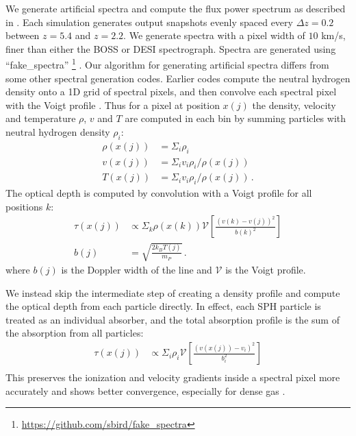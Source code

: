 \documentclass[a4paper,11pt]{article}
\newcommand{\Lya}{Lyman-$\alpha$}
\begin{document}
We generate artificial spectra and compute the flux power spectrum as described in \cite{Bird:2019}. Each simulation generates output snapshots evenly spaced every $\Delta z = 0.2$ between $z = 5.4$ and $z = 2.2$. We generate spectra with a pixel width of $10$ km/s, finer than either the BOSS or DESI spectrograph. Spectra are generated using ``fake\_spectra'' \footnote{\url{https://github.com/sbird/fake_spectra}} \cite{FSFE:2017}. Our algorithm for generating artificial spectra differs from some other spectral generation codes. Earlier codes compute the neutral hydrogen density onto a 1D grid of spectral pixels, and then convolve each spectral pixel with the Voigt profile \cite[e.g.~]{Theuns:1998, Chabanier:2022}. Thus for a pixel at position $x(j)$ the density, velocity and temperature $\rho$, $v$ and $T$ are computed in each bin by summing particles with neutral hydrogen density $\rho_i$:
\begin{align}
 \rho(x(j)) &= \Sigma_i \rho_i \\
 v(x(j)) &= \Sigma_i v_i \rho_i / \rho(x(j)) \\
 T(x(j)) &= \Sigma_i v_i \rho_i / \rho(x(j))\,.
\end{align}
The optical depth is computed by convolution with a Voigt profile for all positions $k$:
\begin{align}
 \tau(x(j)) &\propto \Sigma_k \rho(x(k)) \mathcal{V}\left[\frac{(v(k) - v(j))^2}{b(k)^2}\right] \\
 b(j) &= \sqrt{\frac{2 k_B T(j)}{m_P}}\,.
\end{align}
where $b(j)$ is the Doppler width of the line and $\mathcal{V}$ is the Voigt profile.

We instead skip the intermediate step of creating a density profile and compute the optical depth from each particle directly. In effect, each SPH particle is treated as an individual absorber, and the total absorption profile is the sum of the absorption from all particles:
\begin{align}
 \tau(x(j)) &\propto \Sigma_i \rho_i \mathcal{V}\left[\frac{(v(x(j)) - v_i)^2}{b_i^2}\right] \\
\end{align}
This preserves the ionization and velocity gradients inside a spectral pixel more accurately and shows better convergence, especially for dense gas \cite{Bird:2015}.

\end{document}
